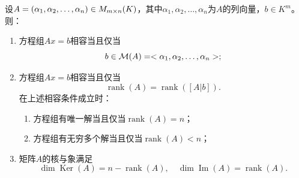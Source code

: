 \begin{theorem}\label{theo:SolutionOfSLE2}
	设$A=(\alpha_1, \alpha_2, \dots, \alpha_{n})\in M_{m\times n}(K)$，其中$\alpha_1,\alpha_2,\dots,\alpha_n$为$A$的列向量，$b\in K^m$。则：
	\begin{enumerate}
		\item 方程组$Ax=b$相容当且仅当
		\begin{equation*}
			b\in\mathcal{M}(A)=<\alpha_1, \alpha_2, \dots, \alpha_{n}>;
		\end{equation*}
		\item 方程组$Ax=b$相容当且仅当
		\begin{equation*}
			\operatorname{rank}(A)=\operatorname{rank}([A|b]).
		\end{equation*}
		在上述相容条件成立时：
		\begin{enumerate}
			\item 方程组有唯一解当且仅当$\operatorname{rank}(A)=n$；
			\item 方程组有无穷多个解当且仅当$\operatorname{rank}(A)<n$；
		\end{enumerate}
		\item 矩阵$A$的核与象满足
		\begin{equation*}
			\dim\operatorname{Ker}(A)=n-\operatorname{rank}(A),
			\quad
			\dim\operatorname{Im}(A)=\operatorname{rank}(A).
		\end{equation*}
	\end{enumerate}
\end{theorem}
